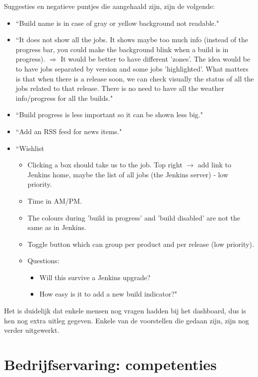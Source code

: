 \documentclass[10pt,a4paper]{article}
\begin{document}
\begin{appendices}
Suggesties en negatieve puntjes die aangehaald zijn, zijn de volgende:
\begin{itemize}
\item ``Build name is in case of gray or yellow background not readable."
\item ``It does not show all the jobs. It shows maybe too much info (instead of the progress bar, you could make the background blink when a build is in progress). $\Rightarrow$ It would be better to have different 'zones'. The idea would be to have jobs separated by version and some jobs 'highlighted'. What matters is that when there is a release soon, we can check visually the status of all the jobs related to that release. There is no need to have all the weather info/progress for all the builds."
\item ``Build progress is less important so it can be shown less big."
\item ``Add an RSS feed for news items."
\item ``Wishlist
\begin{itemize}
\item Clicking a box should take us to the job. Top right $\rightarrow$ add link to Jenkins home, maybe the list of all jobs (the Jenkins server) - low priority.
\item Time in AM/PM.
\item The colours during 'build in progress' and 'build disabled' are not the same as in Jenkins.
\item Toggle button which can group per product and per release (low priority).
\item Questions:
\begin{itemize}
\item Will this survive a Jenkins upgrade?
\item How easy is it to add a new build indicator?"
\end{itemize}
\end{itemize}
\end{itemize}

Het is duidelijk dat enkele mensen nog vragen hadden bij het dashboard, dus is hen nog extra uitleg gegeven. Enkele van de voorstellen die gedaan zijn, zijn nog verder uitgewerkt.

\clearpage

\section{Bedrijfservaring: competenties}
\label{competenties}


\end{appendices}
\end{document}
